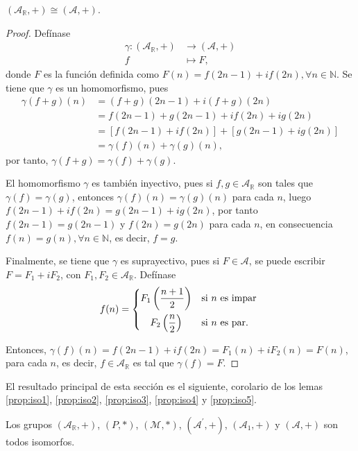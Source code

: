 \begin{lemma}\label{prop:iso5}
$(\mathcal{A}_{\mathbb{R}},+) \cong (\mathcal{A},+)$.
\end{lemma}
\begin{proof}
Defínase
\begin{align*}
    \gamma : (\mathcal{A}_{\mathbb{R}},+) & \longrightarrow (\mathcal{A},+) \\
    f & \longmapsto F,
\end{align*}
donde $F$ es la función definida como $F(n)=f(2n-1)+if(2n), \forall n \in \mathbb{N}$. Se tiene que $\gamma$ es un homomorfismo, pues
\begin{align*}
    \gamma(f+g)(n) &= (f+g)(2n-1)+i (f+g)(2n) \\
                   &= f(2n-1)+g(2n-1)+i f(2n)+i g(2n) \\
                   &= [f(2n-1)+i f(2n)]+[g(2n-1)+i g(2n)] \\
                   &= \gamma(f)(n)+\gamma(g)(n),
\end{align*}
por tanto, $\gamma(f+g)=\gamma(f)+\gamma(g)$.
\bigskip

El homomorfismo $\gamma$ es también inyectivo, pues si $f,g \in \mathcal{A}_{\mathbb{R}}$ son tales que $\gamma(f)=\gamma(g)$, entonces $\gamma(f)(n)=\gamma(g)(n)$ para cada $n$, luego $f(2n-1)+i f(2n)=g(2n-1)+ i g(2n)$, por tanto $f(2n-1)=g(2n-1)$ y $f(2n)=g(2n)$ para cada $n$, en consecuencia $f(n)=g(n), \forall n \in \mathbb{N}$, es decir, $f=g$.
\bigskip

Finalmente, se tiene que $\gamma$ es suprayectivo, pues si $F \in \mathcal{A}$, se puede escribir $F=F_1+i F_2$, con $F_1, F_2 \in \mathcal{A}_{\mathbb{R}}$. Defínase
{\everymath{\displaystyle}
    \begin{equation*}
        f(n) = \begin{dcases}
            \hfil F_1 \left( \frac{n+1}{2} \right) & \text{si }n \text{ es impar } \\
            \hfil F_2 \left( \frac{n}{2} \right) & \text{si }n \text{ es par}.
        \end{dcases}
    \end{equation*}
}

Entonces, $\gamma(f)(n)=f(2n-1)+i f(2n)=F_1(n)+i F_2(n)=F(n)$, para cada $n$, es decir, $f \in \mathcal{A}_{\mathbb{R}}$ es tal que $\gamma(f)=F$.
\end{proof}

El resultado principal de esta sección es el siguiente, corolario de los lemas \ref{prop:iso1}, \ref{prop:iso2}, \ref{prop:iso3}, \ref{prop:iso4} y \ref{prop:iso5}.

\begin{theorem}
Los grupos $(\mathcal{A}_{\mathbb{R}},+)$, $(P,*)$, $(\mathcal{M},*)$, $(\mathcal{A}^\prime,+)$, $(\mathcal{A}_1,+)$ y $(\mathcal{A},+)$ son todos isomorfos. 
\end{theorem}
